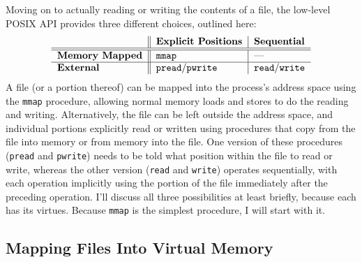 Moving on to actually reading or
writing the contents of a file, the low-level POSIX API provides three
different choices, outlined here:
\[\label{file-access-styles-table}\begin{tabular}{l||l|l}
&\bf Explicit Positions&\bf Sequential\\\hline\hline
\bf Memory Mapped&\texttt{mmap}&---\\\hline
\bf External&\texttt{pread}/\texttt{pwrite}&\texttt{read}/\texttt{write}
\end{tabular}\]
A file (or a portion thereof) can be mapped into
the process's address space using the \verb|mmap| procedure, allowing
normal memory loads and stores to do the reading and writing.  Alternatively, the
file can be left outside the address space, and individual portions
explicitly read or written using procedures that copy from the file
into memory or from memory into the file.  One version of these
procedures (\verb|pread| and \verb|pwrite|) needs to be told what
position within the file to read or write, whereas the other version
(\verb|read| and \verb|write|) operates sequentially, with each
operation implicitly using the portion of the file immediately after
the preceding operation.  I'll discuss all three possibilities at
least briefly, because each has its virtues.  Because \verb|mmap| is the
simplest procedure, I will start with it.

\subsection{Mapping Files Into Virtual Memory}

